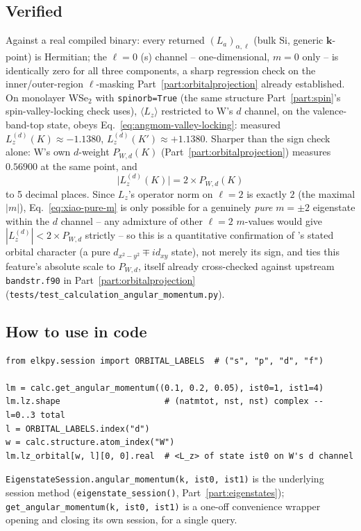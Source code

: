 \documentclass[11pt]{article}
\begin{document}
\subsection{Verified}

Against a real compiled binary: every returned $(L_a)_{\alpha,\ell}$ (bulk Si, generic
$\mathbf k$-point) is Hermitian; the $\ell=0$ (s) channel -- one-dimensional, $m=0$ only --
is identically zero for all three components, a sharp regression check on the
inner/outer-region $\ell$-masking Part~\ref{part:orbitalprojection} already established.
On monolayer WSe$_2$ with \texttt{spinorb=True} (the same structure
Part~\ref{part:spin}'s spin-valley-locking check uses), $\langle L_z\rangle$ restricted to
W's $d$ channel, on the valence-band-top state, obeys
Eq.~\eqref{eq:angmom-valley-locking}: measured $L_z^{(d)}(K)\approx-1.1380$,
$L_z^{(d)}(K')\approx+1.1380$. Sharper than the sign check alone: W's own $d$-weight
$P_{W,d}(K)$ (Part~\ref{part:orbitalprojection}) measures $0.56900$ at the same point, and
\begin{equation}
  \big|L_z^{(d)}(K)\big| = 2\times P_{W,d}(K)
  \label{eq:xiao-pure-m}
\end{equation}
to 5 decimal places. Since $L_z$'s operator norm on $\ell=2$ is exactly $2$ (the maximal
$|m|$), Eq.~\eqref{eq:xiao-pure-m} is only possible for a genuinely \emph{pure} $m=\pm2$
eigenstate within the $d$ channel -- any admixture of other $\ell=2$ $m$-values would give
$|L_z^{(d)}|<2\times P_{W,d}$ strictly -- so this is a quantitative confirmation of
\cite{xiao2012}'s stated orbital character (a pure $d_{x^2-y^2}\mp id_{xy}$ state), not
merely its sign, and ties this feature's absolute scale to $P_{W,d}$, itself already
cross-checked against upstream \texttt{bandstr.f90} in Part~\ref{part:orbitalprojection}
(\texttt{tests/test\_calculation\_angular\_momentum.py}).

\subsection{How to use in code}

\begin{verbatim}
from elkpy.session import ORBITAL_LABELS  # ("s", "p", "d", "f")

lm = calc.get_angular_momentum((0.1, 0.2, 0.05), ist0=1, ist1=4)
lm.lz.shape                     # (natmtot, nst, nst) complex -- l=0..3 total
l = ORBITAL_LABELS.index("d")
w = calc.structure.atom_index("W")
lm.lz_orbital[w, l][0, 0].real  # <L_z> of state ist0 on W's d channel
\end{verbatim}
\texttt{EigenstateSession.angular\_momentum(k, ist0, ist1)} is the underlying session
method (\texttt{eigenstate\_session()}, Part~\ref{part:eigenstates});
\texttt{get\_angular\_momentum(k, ist0, ist1)} is a one-off convenience wrapper opening and
closing its own session, for a single query.
\end{document}
